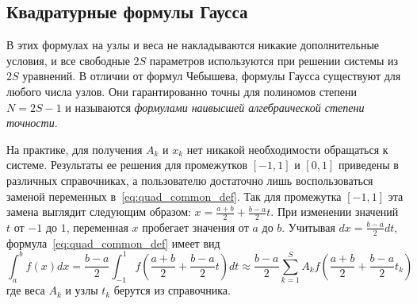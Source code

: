 \subsection{Квадратурные формулы Гаусса}

В этих формулах на узлы и веса не накладываются никакие дополнительные условия, и все свободные $2S$ параметров
используются при решении системы из $2S$ уравнений. В отличии от формул Чебышева, формулы Гаусса существуют для любого
числа узлов. Они гарантированно точны для полиномов степени $N = 2S - 1$ и называются \emph{формулами наивысшей
алгебраической степени точности}.
\vspace{10pt}

На практике, для получения $A_k$ и $x_k$ нет никакой необходимости обращаться к системе. Результаты ее решения для
промежутков $[-1, 1]$ и $[0, 1]$ приведены в различных справочниках, а пользователю достаточно лишь воспользоваться
заменой переменных в~\eqref{eq:quad_common_def}. Так для промежутка $[-1, 1]$ эта замена выглядит следующим образом:
$\displaystyle x = \frac{a + b}{2} + \frac{b - a}{2}t$. При изменении значений $t$ от $-1$ до $1$, переменная $x$
пробегает значения от $a$ до $b$. Учитывая $\displaystyle dx = \frac{b-a}{2}dt$, формула~\eqref{eq:quad_common_def}
имеет вид
\begin{equation}
    \int_{a}^{b} f(x)dx = \frac{b-a}{2}\int_{-1}^{1} f\left( \frac{a+b}{2} + \frac{b-a}{2}t \right)dt \approx \frac{b-a}{2}\sum_{k=1}^{S} A_k f\left( \frac{a+b}{2} + \frac{b-a}{2}t_k \right)\label{eq:quad_common_def_2}
\end{equation}
где веса $A_k$ и узлы $t_k$ берутся из справочника.
